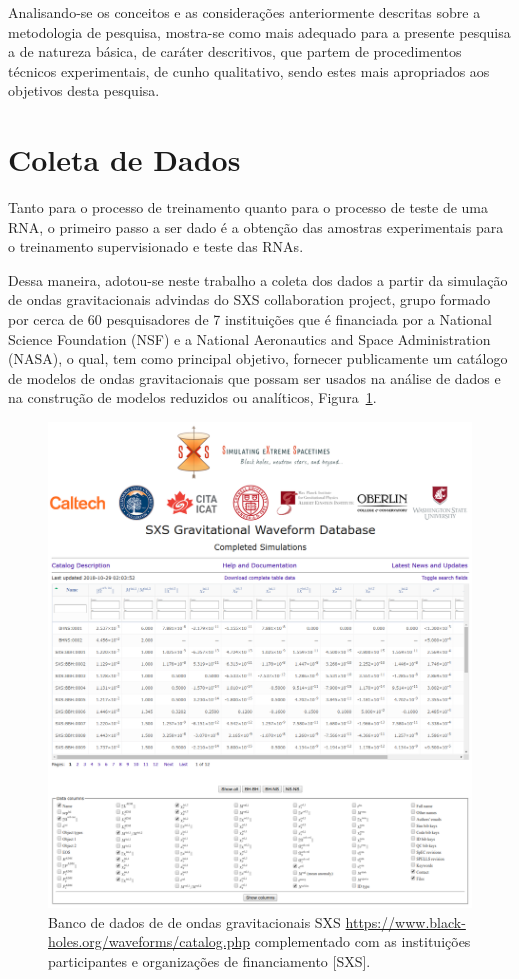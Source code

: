 Analisando-se os conceitos e as considerações anteriormente descritas sobre a metodologia de pesquisa, mostra-se como mais adequado para a presente pesquisa a de natureza básica, de caráter descritivos, que partem de procedimentos técnicos experimentais, de cunho qualitativo, sendo estes mais apropriados aos objetivos desta pesquisa.
\section{Coleta de Dados}
Tanto para o processo de treinamento quanto para o processo de teste de uma RNA, o primeiro passo a ser dado é a obtenção das amostras experimentais para o treinamento supervisionado e teste das RNAs.

Dessa maneira, adotou-se neste trabalho a coleta dos dados a partir da simulação de ondas gravitacionais advindas do SXS collaboration project, grupo formado por cerca de 60 pesquisadores de 7 instituições que é financiada por a National Science Foundation (NSF) e a National Aeronautics and Space Administration (NASA), o qual, tem como principal objetivo, fornecer publicamente um catálogo de modelos de ondas gravitacionais que possam ser usados na análise de dados e na construção de modelos reduzidos ou analíticos, Figura~\ref{figsxs}.

\begin{figure}[ht]
\centering
\includegraphics[width=1\textwidth]{figuras/sxs.png}
\caption{Banco de dados de de ondas gravitacionais SXS \href{https://www.black-holes.org/waveforms/catalog.php}{https://www.black-holes.org/waveforms/catalog.php} complementado com as instituições participantes e organizações de financiamento [SXS].}
\label{figsxs}
\end{figure}

